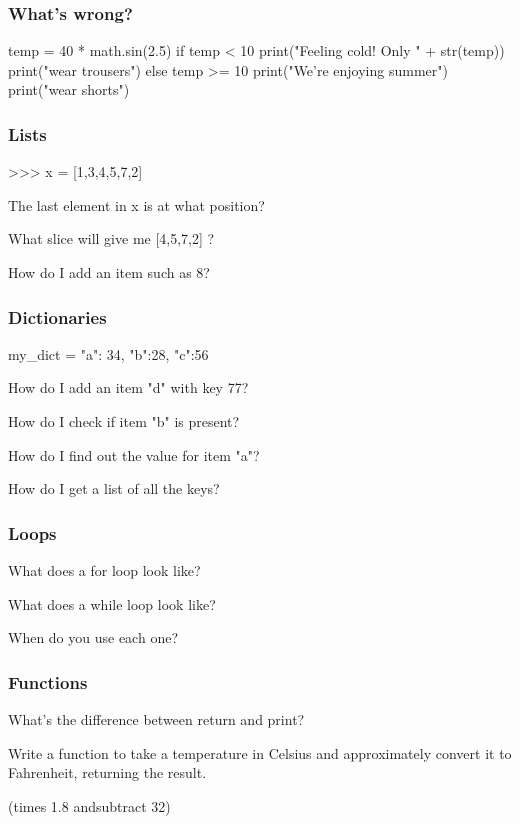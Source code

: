 \documentclass{beamer}
\begin{document}
\begin{frame}[fragile]
\frametitle{What's wrong?}
\begin{code}
temp = 40 * math.sin(2.5)
if temp < 10
   print("Feeling cold! Only " + str(temp))
   print("wear trousers")
else temp >= 10
   print("We're enjoying summer")
   print("wear shorts")
\end{code}
\end{frame}

\begin{frame}[fragile]
\frametitle{Lists}
\begin{code}
>>> x = [1,3,4,5,7,2]
\end{code}
The last element in x is at what position?

\bigskip

What slice will give me [4,5,7,2] ?

\bigskip

How do I add an item such as 8?
\end{frame}


\begin{frame}[fragile]
\frametitle{Dictionaries}
\begin{code}
my_dict = { "a": 34, "b":28, "c":56 }
\end{code}
How do I add an item "d" with key 77?

\bigskip

How do I check if item "b" is present?

\bigskip

How do I find out the value for item "a"?

\bigskip

How do I get a list of all the keys?
\end{frame}

\begin{frame}[fragile]
\frametitle{Loops}
What does a for loop look like?

What does a while loop look like?

When do you use each one?
\end{frame}

\begin{frame}[fragile]
\frametitle{Functions}
What's the difference between return and print?

Write a function to take a temperature in Celsius and
approximately convert it to Fahrenheit, returning the result. 

(times 1.8 andsubtract 32)
\end{frame}
\end{document}
